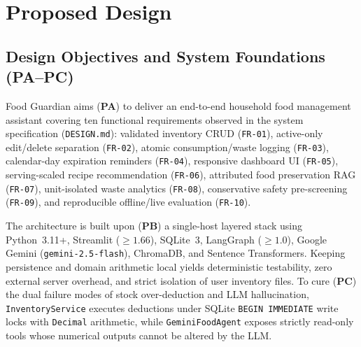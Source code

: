 \documentclass[conference]{IEEEtran}
\begin{document}
\section{Proposed Design}

\subsection{Design Objectives and System Foundations (PA--PC)}
Food Guardian aims (\textbf{PA}) to deliver an end-to-end household food management assistant covering ten functional requirements observed in the system specification (\texttt{DESIGN.md}): validated inventory CRUD (\texttt{FR-01}), active-only edit/delete separation (\texttt{FR-02}), atomic consumption/waste logging (\texttt{FR-03}), calendar-day expiration reminders (\texttt{FR-04}), responsive dashboard UI (\texttt{FR-05}), serving-scaled recipe recommendation (\texttt{FR-06}), attributed food preservation RAG (\texttt{FR-07}), unit-isolated waste analytics (\texttt{FR-08}), conservative safety pre-screening (\texttt{FR-09}), and reproducible offline/live evaluation (\texttt{FR-10}).

The architecture is built upon (\textbf{PB}) a single-host layered stack using Python~3.11+, Streamlit ($\ge 1.66$), SQLite~3, LangGraph ($\ge 1.0$), Google Gemini (\texttt{gemini-2.5-flash}), ChromaDB, and Sentence Transformers. Keeping persistence and domain arithmetic local yields deterministic testability, zero external server overhead, and strict isolation of user inventory files. To cure (\textbf{PC}) the dual failure modes of stock over-deduction and LLM hallucination, \texttt{InventoryService} executes deductions under SQLite \texttt{BEGIN IMMEDIATE} write locks with \texttt{Decimal} arithmetic, while \texttt{GeminiFoodAgent} exposes strictly read-only tools whose numerical outputs cannot be altered by the LLM.

\end{document}
